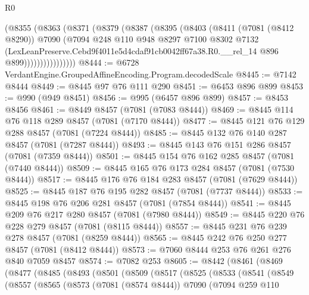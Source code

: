 \begin{lexlean}{R0}
\begin{coremodule}
                (@8355
                  (@8363
                    (@8371
                      (@8379
                        (@8387
                          (@8395
                            (@8403
                              (@8411
                                (@7081 (@8412 @8290))
                                @7090
                                (@7094
                                  @248
                                  @110
                                  @948
                                  @8297
                                  @7100
                                  @8302
                                  @7132
                                  (LexLeanPreserve.Cebd9f4011e5d4cdaf91cb0042ff67a38.R0.__rel_14
                                    @896
                                    @899))))))))))))))))
@8444 := @6728 VerdantEngine.GroupedAffineEncoding.Program.decodedScale
@8445 := @7142 @8444
@8449 := @8445 @97 @76 @111 @290
@8451 := @6453 @896 @899
@8453 := @990 (@949 @8451)
@8456 := @995 (@6457 @896 @899)
@8457 := @8453 @8456
@8461 := @8449 @8457 (@7081 (@7083 @8444))
@8469 := @8445 @114 @76 @118 @289 @8457 (@7081 (@7170 @8444))
@8477 := @8445 @121 @76 @129 @288 @8457 (@7081 (@7224 @8444))
@8485 := @8445 @132 @76 @140 @287 @8457 (@7081 (@7287 @8444))
@8493 := @8445 @143 @76 @151 @286 @8457 (@7081 (@7359 @8444))
@8501 := @8445 @154 @76 @162 @285 @8457 (@7081 (@7440 @8444))
@8509 := @8445 @165 @76 @173 @284 @8457 (@7081 (@7530 @8444))
@8517 := @8445 @176 @76 @184 @283 @8457 (@7081 (@7629 @8444))
@8525 := @8445 @187 @76 @195 @282 @8457 (@7081 (@7737 @8444))
@8533 := @8445 @198 @76 @206 @281 @8457 (@7081 (@7854 @8444))
@8541 := @8445 @209 @76 @217 @280 @8457 (@7081 (@7980 @8444))
@8549 := @8445 @220 @76 @228 @279 @8457 (@7081 (@8115 @8444))
@8557 := @8445 @231 @76 @239 @278 @8457 (@7081 (@8259 @8444))
@8565 := @8445 @242 @76 @250 @277 @8457 (@7081 (@8412 @8444))
@8573 := @7060 @8444 @253 @76 @261 @276 @840 @7059 @8457
@8574 := @7082 @253
@8605 := @8442
    (@8461
      (@8469
        (@8477
          (@8485
            (@8493
              (@8501
                (@8509
                  (@8517
                    (@8525
                      (@8533
                        (@8541
                          (@8549
                            (@8557
                              (@8565
                                (@8573
                                  (@7081 (@8574 @8444))
                                  @7090
                                  (@7094
                                    @259
                                    @110

\end{coremodule}
\end{lexlean}
